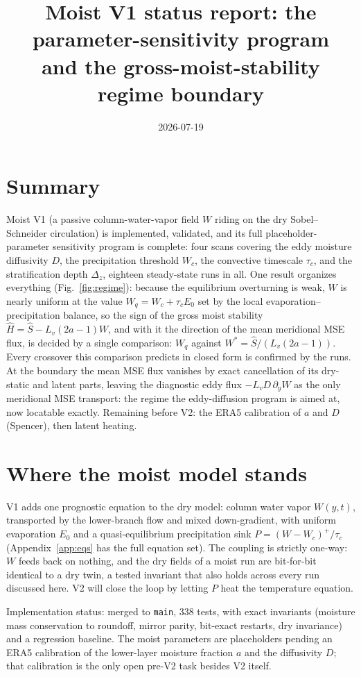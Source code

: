 \documentclass[11pt]{article}
\title{Moist V1 status report: the parameter-sensitivity program\\
and the gross-moist-stability regime boundary}
\date{2026-07-19}
\newcommand{\py}{\partial_y}
\newcommand{\Shat}{\hat S}
\newcommand{\Hhat}{\hat H}
\newcommand{\Wq}{W_q}
\newcommand{\Wstar}{W^*}
\begin{document}
\maketitle

\section*{Summary}

Moist V1 (a passive column-water-vapor field $W$ riding on the dry
Sobel--Schneider circulation) is implemented, validated, and its full
placeholder-parameter sensitivity program is complete: four scans covering
the eddy moisture diffusivity $D$, the precipitation threshold $W_c$, the
convective timescale $\tau_c$, and the stratification depth $\Delta_z$,
eighteen steady-state runs in all. One result organizes everything
(Fig.~\ref{fig:regime}): because the equilibrium overturning is weak, $W$ is
nearly uniform at the value $\Wq = W_c + \tau_c E_0$ set by the local
evaporation--precipitation balance, so the sign of the gross moist stability
$\Hhat = \Shat - L_v(2a{-}1)W$, and with it the direction of the mean
meridional MSE flux, is decided by a single comparison: $\Wq$ against
$\Wstar = \Shat/(L_v(2a{-}1))$. Every crossover this comparison predicts in
closed form is confirmed by the runs. At the
boundary the mean MSE flux vanishes by exact cancellation of its dry-static
and latent parts, leaving the diagnostic eddy flux $-L_v D\,\py W$ as the
only meridional MSE transport: the regime the eddy-diffusion program is
aimed at, now locatable exactly. Remaining before V2: the ERA5 calibration
of $a$ and $D$ (Spencer), then latent heating.

\section{Where the moist model stands}

V1 adds one prognostic equation to the dry model: column water vapor
$W(y,t)$, transported by the lower-branch flow and mixed down-gradient,
with uniform evaporation $E_0$ and a quasi-equilibrium precipitation sink
$P = (W - W_c)^+/\tau_c$ (Appendix~\ref{app:eqs} has the full equation
set). The coupling is strictly one-way: $W$ feeds back on nothing, and the
dry fields of a moist run are bit-for-bit identical to a dry twin, a tested
invariant that also holds across every run discussed here. V2 will close
the loop by letting $P$ heat the temperature equation.

Implementation status: merged to \texttt{main}, 338 tests, with exact
invariants (moisture mass conservation to roundoff, mirror parity, bit-exact
restarts, dry invariance) and a regression baseline. The moist parameters
are placeholders pending an ERA5 calibration of the lower-layer moisture
fraction $a$ and the diffusivity $D$; that calibration is the only open
pre-V2 task besides V2 itself.
\end{document}

